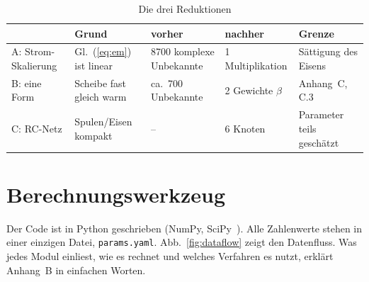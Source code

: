 \documentclass[a4paper, 10pt, conference]{ieeeconf}
\begin{document}
\begin{table}[t]
\caption{Die drei Reduktionen}
\label{tab:mor}
\centering\footnotesize
\begin{tabularx}{\textwidth}{@{}lYYYY@{}}
\toprule
 & Grund & vorher & nachher & Grenze \\
\midrule
A: Strom-Skalierung & Gl.~(\ref{eq:em}) ist linear & 8700 komplexe Unbekannte & 1 Multiplikation & Sättigung des Eisens \\
B: eine Form & Scheibe fast gleich warm & ca.\ 700 Unbekannte & 2 Gewichte $\beta$ & Anhang~C, C.3 \\
C: RC-Netz & Spulen/Eisen kompakt & -- & 6 Knoten & Parameter teils geschätzt \\
\bottomrule
\end{tabularx}
\end{table}

\section{Berechnungswerkzeug}
\label{sec:code}

Der Code ist in Python geschrieben (NumPy, SciPy~\cite{virtanen2020scipy}).
Alle Zahlenwerte stehen in einer einzigen Datei, \texttt{params.yaml}.
Abb.~\ref{fig:dataflow} zeigt den Datenfluss. Was jedes Modul einliest, wie
es rechnet und welches Verfahren es nutzt, erklärt Anhang~B in
einfachen Worten.
\end{document}
